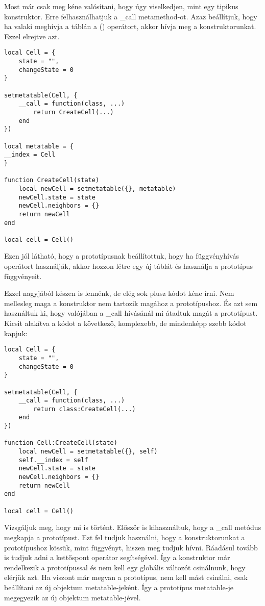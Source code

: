 Most már csak meg kéne valósítani, hogy úgy viselkedjen, mint egy tipikus konstruktor. Erre felhasználhatjuk a \_call metamethod-ot. Azaz beállítjuk, hogy ha valaki meghívja a táblán a () operátort, akkor hívja meg a konstruktorunkat. Ezzel elrejtve azt.
\scriptsize
\begin{lstlisting}
local Cell = {
	state = "",
	changeState = 0
}

setmetatable(Cell, {
	__call = function(class, ...)
		return CreateCell(...)
	end
})

local metatable = {
__index = Cell
}

function CreateCell(state)
	local newCell = setmetatable({}, metatable)
	newCell.state = state
	newCell.neighbors = {}
	return newCell
end

local cell = Cell()
\end{lstlisting}
\normalsize
Ezen jól látható, hogy a prototípusnak beállítottuk, hogy ha függvényhívás operátort használják, akkor hozzon létre egy új táblát és használja a prototípus függvényeit.

Ezzel nagyjából készen is lennénk, de elég sok plusz kódot kéne írni. Nem mellesleg maga a konstruktor nem tartozik magához a prototípushoz. És azt sem használtuk ki, hogy valójában a \_call hívásánál mi átadtuk magát a prototípust. Kicsit alakítva a kódot a következő, komplexebb, de mindenképp szebb kódot kapjuk:
\scriptsize
\begin{lstlisting}
local Cell = {
	state = "",
	changeState = 0
}

setmetatable(Cell, {
	__call = function(class, ...)
		return class:CreateCell(...)
	end
})

function Cell:CreateCell(state)
	local newCell = setmetatable({}, self)
	self.__index = self
	newCell.state = state
	newCell.neighbors = {}
	return newCell
end

local cell = Cell()
\end{lstlisting}
\normalsize
Vizsgáljuk meg, hogy mi is történt. Először is kihasználtuk, hogy a \_call metódus megkapja a prototípust. Ezt fel tudjuk használni, hogy a konstruktorunkat a prototípushoz kössük, mint függvényt, hiszen meg tudjuk hívni. Ráadásul tovább is tudjuk adni a kettőspont operátor segítségével. Így a konstruktor már rendelkezik a prototípussal és nem kell egy globális változót csinálnunk, hogy elérjük azt. Ha viszont már megvan a prototípus, nem kell mást csinálni, csak beállítani az új objektum metatable-jeként. Így a prototípus metatable-je megegyezik az új objektum metatable-jével. 

